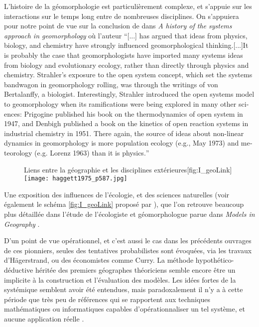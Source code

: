 L'histoire de la géomorphologie est particulièrement complexe, et s'appuie sur les interactions sur le temps long entre de nombreuses disciplines. On s'appuiera pour notre point de vue sur la conclusion de \textcite{Huggett2007} dans \textit{A history of the systems approach in geomorphology} où l'auteur \foreignquote{english}{[...] has argued that ideas from physics, biology, and chemistry have strongly influenced geomorphological thinking.[...]It is probably the case that geomorphologists have imported many systems ideas from biology and evolutionary ecology, rather than directly through physics and chemistry. Strahler’s exposure to the open system concept, which set the systems bandwagon in geomorphology rolling, was through the writings of von Bertalanffy, a biologist. Interestingly, Strahler introduced the open systems model to geomorphology when its ramifications were being explored in many other sciences: Prigogine published his book on the thermodynamics of open system in 1947, and Denbigh published a book on the kinetics of open reaction systems in industrial chemistry in 1951. There again, the source of ideas about non-linear dynamics in geomorphology is more population ecology (e.g., May 1973) and meteorology (e.g. Lorenz 1963) than it is physics.}

  \begin{figure}[htbp]
  \begin{sidecaption}[fortoc]{Liens entre la géographie et les disciplines extérieures}[fig:I_geoLink]
    \centering
   \texttt{[image: haggett1975\_p587.jpg]}
    \end{sidecaption}
  \end{figure}

Une exposition des influences de l'écologie, et des sciences naturelles (voir également le schéma \ref{fig:I_geoLink} proposé par \textcite[587]{Haggett1975}), que l'on retrouve beaucoup plus détaillée dans l'étude de l'écologiste et géomorphologue \textcite{Stoddart1967} parue dans \textit{Models in Geography} \autocite{Chorley1967}.

D'un point de vue opérationnel, et c'est aussi le cas dans les précédents ouvrages de ces pionniers, seules des tentatives probabilistes sont évoquées, via les travaux d'Hägerstrand, ou des économistes comme Curry. La méthode hypothético-déductive héritée des premiers géographes théoriciens semble encore être un implicite à la construction et l'évaluation des modèles. Les idées fortes de la systémique semblent avoir été entendues, mais paradoxalement il n'y a à cette période que très peu de références qui se rapportent aux techniques mathématiques ou informatiques capables d’opérationnaliser un tel système, et aucune application réelle \autocite[467-468]{Harvey1969}.

